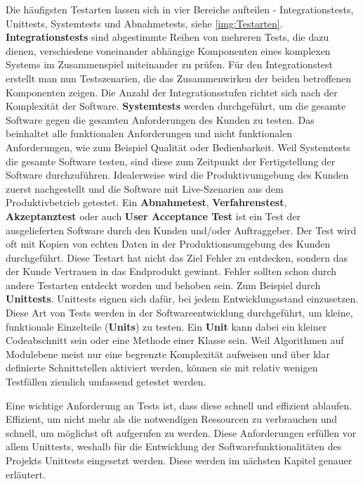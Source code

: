 \documentclass[a4paper,titlepage,halfparskip,12pt]{scrreprt}
\begin{document}
\begin{onehalfspacing}
Die häufigsten Testarten lassen sich in vier Bereiche aufteilen - Integrationstests, Unittests, Systemtests und Abnahmetests, siehe \autoref{img:Testarten}. \textbf{Integrationstests} sind abgestimmte Reihen von mehreren Tests, die dazu dienen, verschiedene voneinander abhängige Komponenten eines komplexen Systems im Zusammenspiel miteinander zu prüfen. Für den Integrationstest erstellt man nun Testszenarien, die das Zusammenwirken der beiden betroffenen Komponenten zeigen. Die Anzahl der Integrationsstufen richtet sich nach der Komplexität der Software. \textbf{Systemtests} werden durchgeführt, um die gesamte Software gegen die gesamten Anforderungen des Kunden zu testen. Das beinhaltet alle funktionalen Anforderungen und nicht funktionalen Anforderungen, wie zum Beispiel Qualität oder Bedienbarkeit. Weil Systemtests die gesamte Software testen, sind diese zum Zeitpunkt der Fertigstellung der Software durchzuführen. Idealerweise wird die Produktivumgebung des Kunden zuerst nachgestellt und die Software mit Live-Szenarien aus dem Produktivbetrieb getestet. Ein \textbf{Abnahmetest}, \textbf{Verfahrenstest}, \textbf{Akzeptanztest} oder auch \textbf{User Acceptance Test} ist ein Test der ausgelieferten Software durch den Kunden und/oder Auftraggeber. Der Test wird oft mit Kopien von echten Daten in der Produktionsumgebung des Kunden durchgeführt. Diese Testart hat nicht das Ziel Fehler zu entdecken, sondern das der Kunde Vertrauen in das Endprodukt gewinnt. Fehler sollten schon durch andere Testarten entdeckt worden und behoben sein. Zum Beispiel durch \textbf{Unittests}. Unittests eignen sich dafür, bei jedem Entwicklungsstand einzusetzen. Diese Art von Tests werden in der Softwareentwicklung durchgeführt, um kleine, funktionale Einzelteile (\textbf{Units}) zu testen. Ein \textbf{Unit} kann dabei ein kleiner Codeabschnitt sein oder eine Methode einer Klasse sein. Weil Algorithmen auf Modulebene meist nur eine begrenzte Komplexität aufweisen und über klar definierte Schnittstellen aktiviert werden, können sie mit relativ wenigen Testfällen ziemlich umfassend getestet werden.\cite{witte2019testmanagement}

\smallskip

Eine wichtige Anforderung an Tests ist, dass diese schnell und effizient ablaufen. Effizient, um nicht mehr als die notwendigen Ressourcen zu verbrauchen und schnell, um möglichst oft aufgerufen zu werden.\cite{hubertz2016softwaretests} Diese Anforderungen erfüllen vor allem Unittests, weshalb für die Entwicklung der Softwarefunktionalitäten des Projekts Unittests eingesetzt werden. Diese werden im nächsten Kapitel genauer erläutert. 


\end{onehalfspacing}
\end{document}
